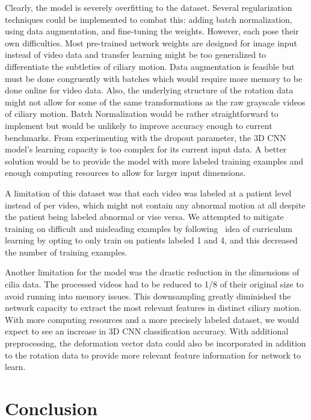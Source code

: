 Clearly, the model is severely overfitting to the dataset. Several regularization techniques could be implemented to combat this: adding batch normalization, using data augmentation, and fine-tuning the weights. However, each pose their own difficulties. Most pre-trained network weights are designed for image input instead of video data and transfer learning \cite{pan2010survey} might be too generalized to differentiate the subtleties of ciliary motion. Data augmentation is feasible but must be done congruently with batches which would require more memory to be done online for video data. Also, the underlying structure of the rotation data might not allow for some of the same transformations as the raw grayscale videos of ciliary motion. Batch Normalization \cite{ioffe2015batch} would be rather straightforward to implement but would be unlikely to improve accuracy enough to current benchmarks. From experimenting with the dropout parameter, the 3D CNN model's learning capacity is too complex for its current input data. A better solution would be to provide the model with more labeled training examples and enough computing resources to allow for larger input dimensions. 
 
A limitation of this dataset was that each video was labeled at a patient level instead of per video, which might not contain any abnormal motion at all despite the patient being labeled abnormal or vise versa. We attempted to mitigate training on difficult and misleading examples by following~\cite{bengio2009curriculum} idea of curriculum learning by opting to only train on patients labeled 1 and 4, and this decreased the number of training examples.

Another limitation for the model was the drastic reduction in the dimensions of cilia data. The processed videos had to be reduced to 1/8 of their original size to avoid running into memory issues. This downsampling greatly diminished the network capacity to extract the most relevant features in distinct ciliary motion. With more computing resources and a more precisely labeled dataset, we would expect to see an increase in 3D CNN classification accuracy. With additional preprocessing, the deformation vector data could also be incorporated in addition to the rotation data to provide more relevant feature information for network to learn.

\section{Conclusion}

